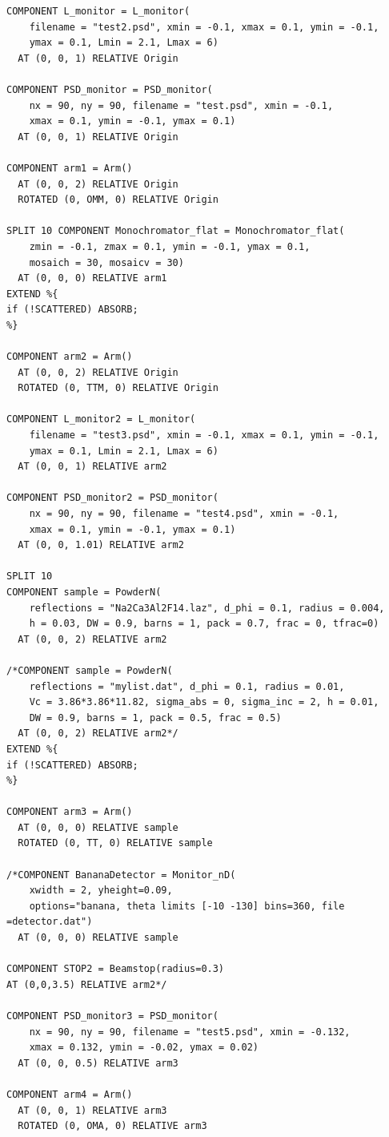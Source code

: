\begin{verbatim}
COMPONENT L_monitor = L_monitor(
    filename = "test2.psd", xmin = -0.1, xmax = 0.1, ymin = -0.1,
    ymax = 0.1, Lmin = 2.1, Lmax = 6)
  AT (0, 0, 1) RELATIVE Origin

COMPONENT PSD_monitor = PSD_monitor(
    nx = 90, ny = 90, filename = "test.psd", xmin = -0.1,
    xmax = 0.1, ymin = -0.1, ymax = 0.1)
  AT (0, 0, 1) RELATIVE Origin

COMPONENT arm1 = Arm()
  AT (0, 0, 2) RELATIVE Origin
  ROTATED (0, OMM, 0) RELATIVE Origin

SPLIT 10 COMPONENT Monochromator_flat = Monochromator_flat(
    zmin = -0.1, zmax = 0.1, ymin = -0.1, ymax = 0.1,
    mosaich = 30, mosaicv = 30)
  AT (0, 0, 0) RELATIVE arm1
EXTEND %{ 
if (!SCATTERED) ABSORB;
%}

COMPONENT arm2 = Arm()
  AT (0, 0, 2) RELATIVE Origin
  ROTATED (0, TTM, 0) RELATIVE Origin

COMPONENT L_monitor2 = L_monitor(
    filename = "test3.psd", xmin = -0.1, xmax = 0.1, ymin = -0.1,
    ymax = 0.1, Lmin = 2.1, Lmax = 6)
  AT (0, 0, 1) RELATIVE arm2

COMPONENT PSD_monitor2 = PSD_monitor(
    nx = 90, ny = 90, filename = "test4.psd", xmin = -0.1,
    xmax = 0.1, ymin = -0.1, ymax = 0.1)
  AT (0, 0, 1.01) RELATIVE arm2

SPLIT 10 
COMPONENT sample = PowderN(
    reflections = "Na2Ca3Al2F14.laz", d_phi = 0.1, radius = 0.004,
    h = 0.03, DW = 0.9, barns = 1, pack = 0.7, frac = 0, tfrac=0)
  AT (0, 0, 2) RELATIVE arm2

/*COMPONENT sample = PowderN(
    reflections = "mylist.dat", d_phi = 0.1, radius = 0.01,
    Vc = 3.86*3.86*11.82, sigma_abs = 0, sigma_inc = 2, h = 0.01,
    DW = 0.9, barns = 1, pack = 0.5, frac = 0.5)
  AT (0, 0, 2) RELATIVE arm2*/
EXTEND %{ 
if (!SCATTERED) ABSORB;
%}

COMPONENT arm3 = Arm()
  AT (0, 0, 0) RELATIVE sample
  ROTATED (0, TT, 0) RELATIVE sample

/*COMPONENT BananaDetector = Monitor_nD(
    xwidth = 2, yheight=0.09, 
    options="banana, theta limits [-10 -130] bins=360, file =detector.dat")
  AT (0, 0, 0) RELATIVE sample

COMPONENT STOP2 = Beamstop(radius=0.3)
AT (0,0,3.5) RELATIVE arm2*/

COMPONENT PSD_monitor3 = PSD_monitor(
    nx = 90, ny = 90, filename = "test5.psd", xmin = -0.132,
    xmax = 0.132, ymin = -0.02, ymax = 0.02)
  AT (0, 0, 0.5) RELATIVE arm3

COMPONENT arm4 = Arm()
  AT (0, 0, 1) RELATIVE arm3
  ROTATED (0, OMA, 0) RELATIVE arm3


\end{verbatim}
